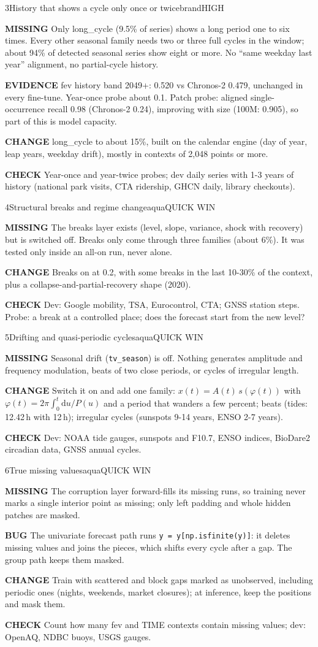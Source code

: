 \documentclass[10pt,a4paper]{article}
\newcommand{\row}[1]{\par\smallskip\textcolor{brandd}{\small\bfseries\MakeUppercase{#1}}\enspace}
\begin{document}
\begin{gapcard}{3}{History that shows a cycle only once or twice}{brand}{HIGH}
\row{Missing} Only long\_cycle (9.5\% of series) shows a long period one to six times. Every other seasonal family needs two or three full cycles in the window; about 94\% of detected seasonal series show eight or more. No ``same weekday last year'' alignment, no partial-cycle history.
\row{Evidence} fev history band 2049+: 0.520 vs Chronos-2 0.479, unchanged in every fine-tune. Year-once probe about 0.1. Patch probe: aligned single-occurrence recall 0.98 (Chronos-2 0.24), improving with size (100M: 0.905), so part of this is model capacity.
\row{Change} long\_cycle to about 15\%, built on the calendar engine (day of year, leap years, weekday drift), mostly in contexts of 2,048 points or more.
\row{Check} Year-once and year-twice probes; dev daily series with 1-3 years of history (national park visits, CTA ridership, GHCN daily, library checkouts).
\end{gapcard}

\begin{gapcard}{4}{Structural breaks and regime change}{aqua}{QUICK WIN}
\row{Missing} The breaks layer exists (level, slope, variance, shock with recovery) but is switched off. Breaks only come through three families (about 6\%). It was tested only inside an all-on run, never alone.
\row{Change} Breaks on at 0.2, with some breaks in the last 10-30\% of the context, plus a collapse-and-partial-recovery shape (2020).
\row{Check} Dev: Google mobility, TSA, Eurocontrol, CTA; GNSS station steps. Probe: a break at a controlled place; does the forecast start from the new level?
\end{gapcard}

\begin{gapcard}{5}{Drifting and quasi-periodic cycles}{aqua}{QUICK WIN}
\row{Missing} Seasonal drift (\texttt{tv\_season}) is off. Nothing generates amplitude and frequency modulation, beats of two close periods, or cycles of irregular length.
\row{Change} Switch it on and add one family: $x(t)=A(t)\,s(\varphi(t))$ with $\varphi(t)=2\pi\int_0^t \mathrm{d}u/P(u)$ and a period that wanders a few percent; beats (tides: 12.42\,h with 12\,h); irregular cycles (sunspots 9-14 years, ENSO 2-7 years).
\row{Check} Dev: NOAA tide gauges, sunspots and F10.7, ENSO indices, BioDare2 circadian data, GNSS annual cycles.
\end{gapcard}

\begin{gapcard}{6}{True missing values}{aqua}{QUICK WIN}
\row{Missing} The corruption layer forward-fills its missing runs, so training never marks a single interior point as missing; only left padding and whole hidden patches are masked.
\row{Bug} The univariate forecast path runs \texttt{y = y[np.isfinite(y)]}: it deletes missing values and joins the pieces, which shifts every cycle after a gap. The group path keeps them masked.
\row{Change} Train with scattered and block gaps marked as unobserved, including periodic ones (nights, weekends, market closures); at inference, keep the positions and mask them.
\row{Check} Count how many fev and TIME contexts contain missing values; dev: OpenAQ, NDBC buoys, USGS gauges.
\end{gapcard}
\end{document}
